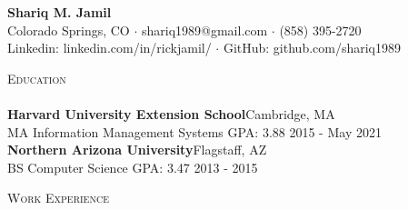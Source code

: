 \documentclass[a4paper]{article}
\newcommand{\lineunder} {
    \vspace*{-8pt} \\
    \hspace*{-18pt} \hrulefill \\
}
\newcommand{\header} [1] {
    {\hspace*{-18pt}\vspace*{6pt} \textsc{#1}}
    \vspace*{-6pt} \lineunder
}
\begin{document}
\vspace*{-40pt}

    

\vspace*{-10pt}
\begin{center}
	{\Huge \bfseries {Shariq M. Jamil}}\\
	Colorado Springs, CO $\cdot$ shariq1989@gmail.com $\cdot$ (858) 395-2720\\
	Linkedin: linkedin.com/in/rickjamil/ $\cdot$ GitHub: github.com/shariq1989
\end{center}

\header{Education}
\textbf{Harvard University Extension School}\hfill Cambridge, MA\\
MA Information Management Systems \textrm{GPA: 3.88} \hfill 2015 - May 2021\\
\vspace{2mm}
\textbf{Northern Arizona University}\hfill Flagstaff, AZ\\
BS Computer Science \textrm{GPA: 3.47} \hfill 2013 - 2015\\
\vspace{2mm}

\header{Work Experience}
\vspace{1mm}
\end{document}
